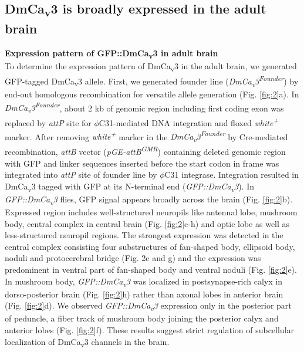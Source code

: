 \subsection*{DmCa\textsubscript{v}3 is broadly expressed in the adult brain}

\textbf{Expression pattern of GFP::DmCa\textsubscript{v}3 in adult brain}\\
To determine the expression pattern of DmCa\textsubscript{v}3 in the adult brain, we generated GFP-tagged DmCa\textsubscript{v}3 allele.
First, we generated founder line (\emph{DmCa\textsubscript{v}3\textsuperscript{Founder}})  by end-out homologous recombination for versatile allele generation\cite{Huang:2009ei} (Fig. \ref{fig:2}a).
 In \emph{DmCa\textsubscript{v}3\textsuperscript{Founder}}, about 2 kb of genomic  region including first coding exon was replaced by \emph{attP} site for  $\phi$C31-mediated DNA integration  and floxed \emph{white\textsuperscript{+}} marker. 
After removing \emph{white\textsuperscript{+}} marker in the \emph{DmCa\textsubscript{v}3\textsuperscript{Founder}} by Cre-mediated recombination, \emph{attB} vector (\emph{pGE-attB\textsuperscript{GMR}}) containing deleted genomic region with GFP and linker sequences inserted before the start codon in frame  was integrated into \emph{attP} site of founder line by $\phi$C31 integrase. 
Integration resulted in DmCa\textsubscript{v}3 tagged with GFP at its N-terminal end (\emph{GFP::DmCa\textsubscript{v}3}). 
In \emph{GFP::DmCa\textsubscript{v}3} flies, GFP signal appears broadly across the brain (Fig. \ref{fig:2}b).
Expressed region includes well-structured neuropils like antennal lobe, mushroom body, central complex in central brain (Fig. \ref{fig:2}c-h) and optic lobe as well as less-structured neuropil regions.
The strongest expression was detected in the central complex consisting four substructures of fan-shaped body, ellipsoid body, noduli and protocerebral bridge (Fig. 2e and g) and the expression was predominent in ventral part of fan-shaped body and ventral noduli (Fig. \ref{fig:2}e). 
In mushroom body, \emph{GFP::DmCa\textsubscript{v}3} was localized in postsynapse-rich calyx in dorso-posterior brain (Fig. \ref{fig:2}h) rather than axonal lobes in anterior brain (Fig. \ref{fig:2}d).
We observed \emph{GFP::DmCa\textsubscript{v}3} expression only in the posterior part of peduncle, a fiber track of mushroom body joining the posterior calyx and anterior lobes (Fig. \ref{fig:2}f).
These results suggest strict regulation of subcellular localization of DmCa\textsubscript{v}3 channels in the brain.


